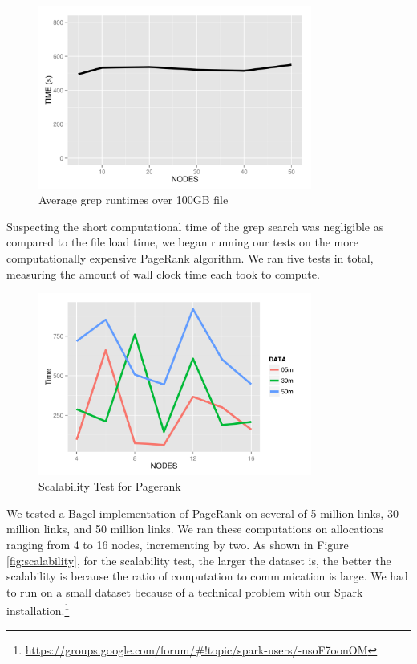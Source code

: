\documentclass{article}
\begin{document}
    \begin{figure}[H]
        \centering
        \includegraphics[width=90mm]{images/bigDataTimes.png}
        \caption{Average grep runtimes over 100GB file}
        \label{fig:bigTime}
    \end{figure}

Suspecting the short computational time of the grep search was negligible as
compared to the file load time, we began running our tests on the more
computationally expensive PageRank algorithm. We ran five tests in total,
measuring the amount of wall clock time each took to compute.

    \begin{figure}[H]
        \centering
        \includegraphics[width=90mm]{images/scalability.png}
        \caption{Scalability Test for Pagerank}
        \label{fig:bscalability}
    \end{figure}


We tested a Bagel implementation of PageRank on several of 5 million links, 30
million links, and 50 million links. We ran these computations on allocations
ranging from 4 to 16 nodes, incrementing by two.  As shown in Figure
\ref{fig:scalability}, for the scalability test, the larger the dataset is, the
better the scalability is because the ratio of computation to communication is
large. We had to run on a small dataset because of a technical problem with our
Spark installation.\footnote{
\url{https://groups.google.com/forum/#!topic/spark-users/-nsoF7oonOM}}
\end{document}
